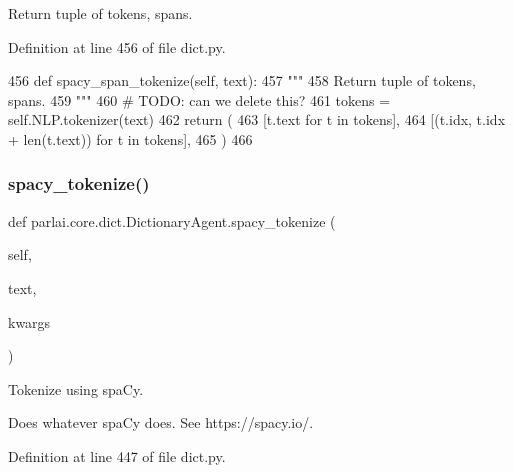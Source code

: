\begin{DoxyVerb}Return tuple of tokens, spans.
\end{DoxyVerb}
 

Definition at line 456 of file dict.\+py.


\begin{DoxyCode}
456     \textcolor{keyword}{def }spacy\_span\_tokenize(self, text):
457         \textcolor{stringliteral}{"""}
458 \textcolor{stringliteral}{        Return tuple of tokens, spans.}
459 \textcolor{stringliteral}{        """}
460         \textcolor{comment}{# TODO: can we delete this?}
461         tokens = self.NLP.tokenizer(text)
462         \textcolor{keywordflow}{return} (
463             [t.text \textcolor{keywordflow}{for} t \textcolor{keywordflow}{in} tokens],
464             [(t.idx, t.idx + len(t.text)) \textcolor{keywordflow}{for} t \textcolor{keywordflow}{in} tokens],
465         )
466 
\end{DoxyCode}
\mbox{\label{classparlai_1_1core_1_1dict_1_1DictionaryAgent_a8e818ad5e11ecb08de6c4b858b2e68f1}} 
\subsubsection{\texorpdfstring{spacy\+\_\+tokenize()}{spacy\_tokenize()}}
{\footnotesize\ttfamily def parlai.\+core.\+dict.\+Dictionary\+Agent.\+spacy\+\_\+tokenize (\begin{DoxyParamCaption}\item[{}]{self,  }\item[{}]{text,  }\item[{}]{kwargs }\end{DoxyParamCaption})}

\begin{DoxyVerb}Tokenize using spaCy.

Does whatever spaCy does. See https://spacy.io/.
\end{DoxyVerb}
 

Definition at line 447 of file dict.\+py.


